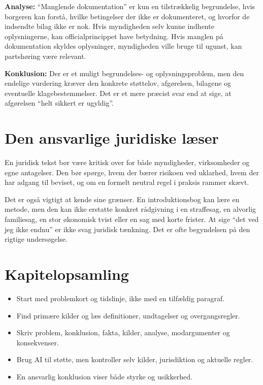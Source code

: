 \textbf{Analyse:} ``Manglende dokumentation'' er kun en tilstrækkelig begrundelse, hvis borgeren kan forstå, hvilke betingelser der ikke er dokumenteret, og hvorfor de indsendte bilag ikke er nok. Hvis myndigheden selv kunne indhente oplysningerne, kan officialprincippet have betydning. Hvis manglen på dokumentation skyldes oplysninger, myndigheden ville bruge til ugunst, kan partshøring være relevant.

\textbf{Konklusion:} Der er et muligt begrundelses- og oplysningsproblem, men den endelige vurdering kræver den konkrete støttelov, afgørelsen, bilagene og eventuelle klagebestemmelser. Det er et mere præcist svar end at sige, at afgørelsen ``helt sikkert er ugyldig''.

\section{Den ansvarlige juridiske læser}

En juridisk tekst bør være kritisk over for både myndigheder, virksomheder og egne antagelser. Den bør spørge, hvem der bærer risikoen ved uklarhed, hvem der har adgang til beviset, og om en formelt neutral regel i praksis rammer skævt.

Det er også vigtigt at kende sine grænser. En introduktionsbog kan lære en metode, men den kan ikke erstatte konkret rådgivning i en straffesag, en alvorlig familiesag, en stor økonomisk tvist eller en sag med korte frister. At sige ``det ved jeg ikke endnu'' er ikke svag juridisk tænkning. Det er ofte begyndelsen på den rigtige undersøgelse.


\section*{Kapitelopsamling}
\begin{itemize}
  \item Start med problemkort og tidslinje, ikke med en tilfældig paragraf.
  \item Find primære kilder og læs definitioner, undtagelser og overgangsregler.
  \item Skriv problem, konklusion, fakta, kilder, analyse, modargumenter og konsekvenser.
  \item Brug AI til støtte, men kontroller selv kilder, jurisdiktion og aktuelle regler.
  \item En ansvarlig konklusion viser både styrke og usikkerhed.
\end{itemize}

